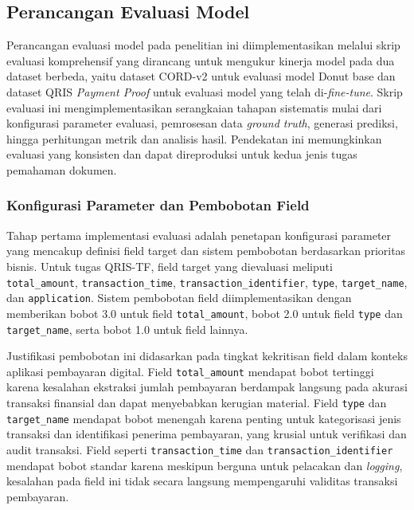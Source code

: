 \subsection{Perancangan Evaluasi Model}
\label{subsec:perancangan-evaluasi-model}

Perancangan evaluasi model pada penelitian ini diimplementasikan melalui skrip evaluasi komprehensif yang dirancang untuk mengukur kinerja model pada dua dataset berbeda, yaitu dataset CORD-v2 untuk evaluasi model Donut base dan dataset QRIS \textit{Payment Proof} untuk evaluasi model yang telah di-\textit{fine-tune}. Skrip evaluasi ini mengimplementasikan serangkaian tahapan sistematis mulai dari konfigurasi parameter evaluasi, pemrosesan data \textit{ground truth}, generasi prediksi, hingga perhitungan metrik dan analisis hasil. Pendekatan ini memungkinkan evaluasi yang konsisten dan dapat direproduksi untuk kedua jenis tugas pemahaman dokumen.

\subsubsection{Konfigurasi Parameter dan Pembobotan Field}

Tahap pertama implementasi evaluasi adalah penetapan konfigurasi parameter yang mencakup definisi field target dan sistem pembobotan berdasarkan prioritas bisnis. Untuk tugas QRIS-TF, field target yang dievaluasi meliputi \texttt{total\_amount}, \texttt{transaction\_time}, \texttt{transaction\_identifier}, \texttt{type}, \texttt{target\_name}, dan \texttt{application}. Sistem pembobotan field diimplementasikan dengan memberikan bobot 3.0 untuk field \texttt{total\_amount}, bobot 2.0 untuk field \texttt{type} dan \texttt{target\_name}, serta bobot 1.0 untuk field lainnya.

Justifikasi pembobotan ini didasarkan pada tingkat kekritisan field dalam konteks aplikasi pembayaran digital. Field \texttt{total\_amount} mendapat bobot tertinggi karena kesalahan ekstraksi jumlah pembayaran berdampak langsung pada akurasi transaksi finansial dan dapat menyebabkan kerugian material. Field \texttt{type} dan \texttt{target\_name} mendapat bobot menengah karena penting untuk kategorisasi jenis transaksi dan identifikasi penerima pembayaran, yang krusial untuk verifikasi dan audit transaksi. Field seperti \texttt{transaction\_time} dan \texttt{transaction\_identifier} mendapat bobot standar karena meskipun berguna untuk pelacakan dan \textit{logging}, kesalahan pada field ini tidak secara langsung mempengaruhi validitas transaksi pembayaran.

